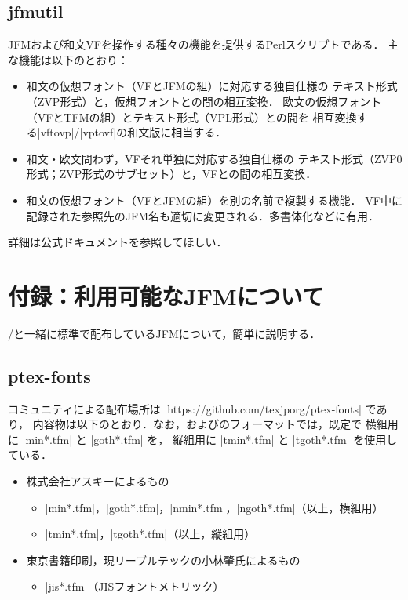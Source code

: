 \documentclass[a4paper,11pt,nomag]{jsarticle}
\begin{document}
\subsection{jfmutil}

JFMおよび和文VFを操作する種々の機能を提供するPerlスクリプトである．
主な機能は以下のとおり：
\begin{itemize}
  \item 和文の仮想フォント（VFとJFMの組）に対応する独自仕様の
    テキスト形式（ZVP形式）と，仮想フォントとの間の相互変換．
    欧文の仮想フォント（VFとTFMの組）とテキスト形式（VPL形式）との間を
    相互変換する|vftovp|/|vptovf|の和文版に相当する．
  \item 和文・欧文問わず，VFそれ単独に対応する独自仕様の
    テキスト形式（ZVP0形式；ZVP形式のサブセット）と，VFとの間の相互変換．
  \item 和文の仮想フォント（VFとJFMの組）を別の名前で複製する機能．
    VF中に記録された参照先のJFM名も適切に変更される．多書体化などに有用．
\end{itemize}
詳細は公式ドキュメントを参照してほしい．


\section{付録：利用可能なJFMについて}\label{jfm-dist}

\pTeX/\upTeX と一緒に標準で配布しているJFMについて，簡単に説明する．

\subsection{ptex-fonts}

コミュニティによる配布場所は |https://github.com/texjporg/ptex-fonts| であり，
内容物は以下のとおり．なお，\pTeX および\pLaTeX のフォーマットでは，既定で
横組用に |min*.tfm| と |goth*.tfm| を，
縦組用に |tmin*.tfm| と |tgoth*.tfm| を使用している．
\begin{itemize}
  \item 株式会社アスキーによるもの
    \begin{itemize}
      \item |min*.tfm|，|goth*.tfm|，|nmin*.tfm|，|ngoth*.tfm|（以上，横組用）
      \item |tmin*.tfm|，|tgoth*.tfm|（以上，縦組用）
    \end{itemize}
  \item 東京書籍印刷，現リーブルテックの小林肇氏によるもの
    \begin{itemize}
      \item |jis*.tfm|（JISフォントメトリック）
    \end{itemize}
\end{itemize}
\end{document}
